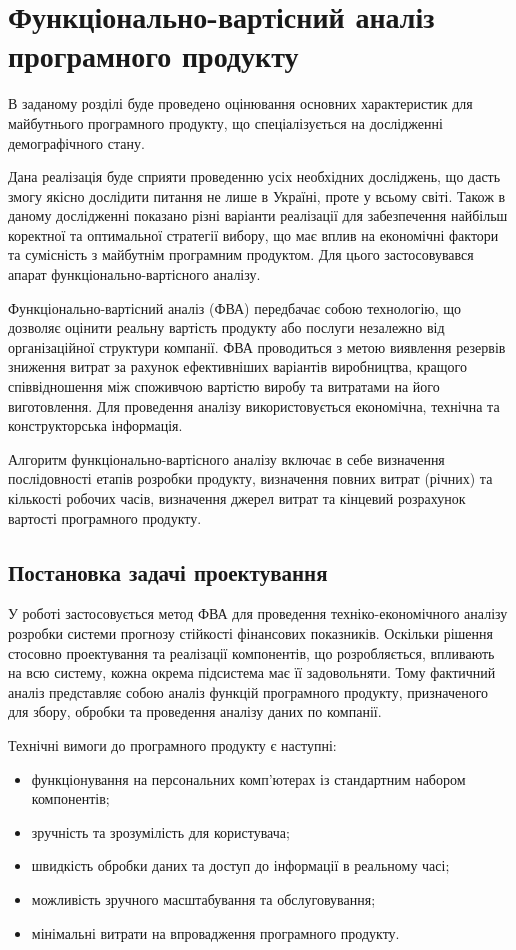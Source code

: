 \documentclass[../diploma]{subfiles}
\begin{document}
\chapter{Функціонально-вартісний аналіз програмного продукту}

В заданому розділі буде проведено оцінювання основних характеристик для майбутнього програмного продукту, що спеціалізується на дослідженні демографічного стану.

Дана реалізація буде сприяти проведенню усіх необхідних досліджень, що дасть змогу якісно дослідити питання не лише в Україні, проте у всьому світі. 
Також в даному дослідженні показано різні варіанти реалізації для забезпечення найбільш коректної та оптимальної стратегії вибору, що має вплив на економічні фактори та сумісність з майбутнім програмним продуктом. Для цього застосовувався апарат функціонально-вартісного аналізу.

Функціонально-вартісний аналіз (ФВА) передбачає собою технологію, що дозволяє оцінити реальну вартість продукту або послуги незалежно від організаційної структури компанії. ФВА проводиться з метою виявлення резервів зниження витрат за рахунок ефективніших варіантів виробництва, кращого співвідношення між споживчою вартістю виробу та витратами на його виготовлення. Для проведення аналізу використовується економічна, технічна та конструкторська інформація.

Алгоритм функціонально-вартісного аналізу включає в себе визначення послідовності етапів розробки продукту, визначення повних витрат (річних) та кількості робочих часів, визначення джерел витрат та кінцевий розрахунок вартості програмного продукту.

\section{Постановка задачі проектування}

У роботі застосовується метод ФВА для  проведення техніко-економічного аналізу розробки системи прогнозу стійкості фінансових показників. Оскільки рішення стосовно проектування та реалізації компонентів, що розробляється, впливають на всю систему, кожна окрема підсистема має її задовольняти. Тому фактичний аналіз представляє собою аналіз функцій програмного продукту, призначеного для збору, обробки та проведення аналізу даних по компанії.

Технічні вимоги до програмного продукту є наступні:
\begin{itemize}
\item функціонування на персональних комп'ютерах із стандартним набором компонентів;
\item зручність та зрозумілість для користувача;
\item швидкість обробки даних та доступ до інформації в реальному часі;
\item можливість зручного масштабування та обслуговування;
\item мінімальні витрати на впровадження програмного продукту.
\end{itemize}
\end{document}
